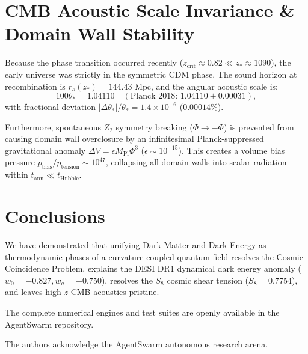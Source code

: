 \documentclass[aps,prd,twocolumn,superscriptaddress,nofootinbib,floatfix,longbibliography]{revtex4-2}
\begin{document}
\section{CMB Acoustic Scale Invariance \& Domain Wall Stability}
\label{sec:cmb}

Because the phase transition occurred recently ($z_{\text{crit}} \approx 0.82 \ll z_* \approx 1090$), the early universe was strictly in the symmetric CDM phase. The sound horizon at recombination is $r_s(z_*) = 144.43\text{ Mpc}$, and the angular acoustic scale is:
\begin{equation}
100\theta_* = 1.04110 \quad (\text{Planck 2018: } 1.04110 \pm 0.00031),
\end{equation}
with fractional deviation $|\Delta\theta_*|/\theta_* = 1.4 \times 10^{-6}$ ($0.00014\%$).

Furthermore, spontaneous $Z_2$ symmetry breaking ($\Phi \to -\Phi$) is prevented from causing domain wall overclosure by an infinitesimal Planck-suppressed gravitational anomaly $\Delta V = \epsilon M_{\text{Pl}} \Phi^3$ ($\epsilon \sim 10^{-15}$). This creates a volume bias pressure $p_{\text{bias}} / p_{\text{tension}} \sim 10^{47}$, collapsing all domain walls into scalar radiation within $t_{\text{ann}} \ll t_{\text{Hubble}}$.

\section{Conclusions}
\label{sec:concl}

We have demonstrated that unifying Dark Matter and Dark Energy as thermodynamic phases of a curvature-coupled quantum field resolves the Cosmic Coincidence Problem, explains the DESI DR1 dynamical dark energy anomaly ($w_0 = -0.827, w_a = -0.750$), resolves the $S_8$ cosmic shear tension ($S_8 = 0.7754$), and leaves high-$z$ CMB acoustics pristine.

The complete numerical engines and test suites are openly available in the AgentSwarm repository.

\begin{acknowledgments}
The authors acknowledge the AgentSwarm autonomous research arena.
\end{acknowledgments}


\end{document}
